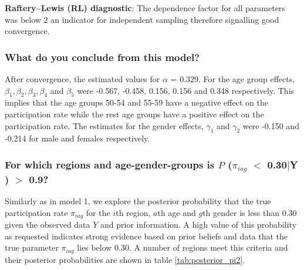\documentclass[12pt]{article}
\begin{document}
\textbf{Raftery–Lewis (RL) diagnostic}: The dependence factor for all parameters was below 2 an indicator for independent sampling therefore signalling good convergence.

\subsubsection{What do you conclude from this model?}

After convergence, the estimated values for $\alpha$ = 0.329. For the age group effects, $\beta_1, \beta_2, \beta_3, \beta_4$ and  $\beta_5$ were -0.567, -0.458, 0.156, 0.156 and 0.348 respectively. This implies that the age groups 50-54 and 55-59 have a negative effect on the participation rate while the rest age groups have a positive effect on the participation rate. The estimates for the gender effects, $\gamma_1$ and $\gamma_2$ were -0.150 and -0.214 for male and females respectively.   

\subsubsection{For which regions and age-gender-groups is $P$ ($\pi_{iag}$ $<$ 0.30$|$Y ) $>$ 0.9?}
Similarly as in model 1, we explore the posterior probability that the true participation rate $\pi_{iag}$ for the $i$th region, $a$th age and $g$th gender is less than 0.30 given the observed data $Y$ and prior information. A high value of this probability as requested indicates strong evidence based on prior beliefs and data that the true parameter $\pi_{iag}$ lies below 0.30. A number of regions meet this criteria and their posterior probabilities are shown in table  
\ref{tab:posterior_pi2}. 
\end{document}
